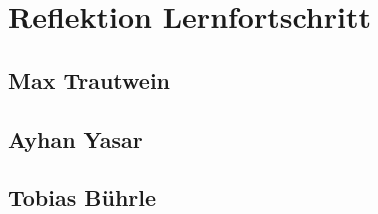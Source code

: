 \chapter{Reflektion Lernfortschritt}\label{ch:reflektion-lernfortschritt}


\section{Max Trautwein}


\section{Ayhan Yasar}


\section{Tobias Bührle}


